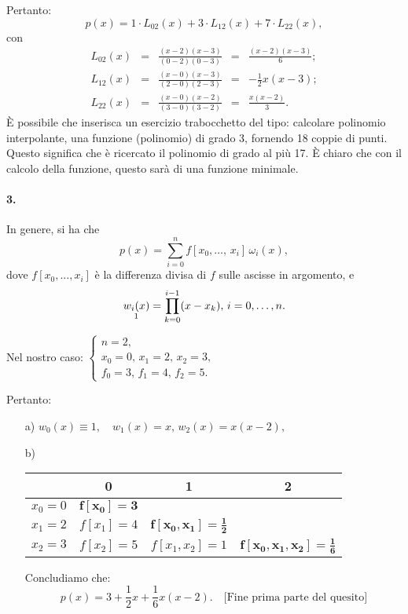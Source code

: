 \noindent Pertanto:
\begin{equation*}
    p(x) = 1\cdot L_{02}(x)+3\cdot L_{12}(x) + 7\cdot L_{22}(x),
\end{equation*}
con
\begin{equation*}
    \begin{matrix}
        L_{02}(x) &=& \frac{(x-2)(x-3)}{(0-2)(0-3)} &=& \frac{(x-2)(x-3)}{6};\\
        L_{12}(x) &=& \frac{(x-0)(x-3)}{(2-0)(2-3)} &=& -\frac{1}{2}x(x-3);\\
        L_{22}(x) &=& \frac{(x-0)(x-2)}{(3-0)(3-2)} &=& \frac{x(x-2)}{3}.
    \end{matrix}
\end{equation*}
È possibile che inserisca un esercizio trabocchetto del tipo: calcolare polinomio interpolante, una funzione (polinomio) di grado 3, fornendo 18 coppie di punti. Questo significa che è ricercato il polinomio di grado al più 17. È chiaro che con il calcolo della funzione, questo sarà di una funzione minimale.

\paragraph{3.} In genere, si ha che
\begin{equation*}
    p(x) = \sum_{i=0}^n f[x_0,\hdots,\, x_i]\,\omega_i(x),
\end{equation*}
dove $f[x_0,\hdots, x_i]$ è la differenza divisa di $f$ sulle ascisse in argomento, e
\begin{equation*}
    \underset{\footnotemark}{w_i(x)}=\prod_{k=0}^{i-1}(x-x_k),\, i=0,\hdots, n.
\end{equation*}

\noindent Nel nostro caso:
$\begin{cases}
    n=2,\\
    x_0=0,\, x_1=2,\, x_2 = 3,\\
    f_0 = 3,\, f_1=4,\, f_2=5.
\end{cases}$

\noindent Pertanto:
\begin{itemize}
    \item[a)] $w_0(x)\equiv 1,\quad w_1(x)=x,\, w_2(x)=x(x-2),$
    \item[b)]
    \begin{tabular}{c|ccc}
         & 0 & 1 & 2 \\
         \hline
        $x_0=0$ & $\boldsymbol{f[x_0]=3}$\\
        $x_1=2$ & $f[x_1]=4$ & $\boldsymbol{f[x_0, x_1]=\frac{1}{2}}$\\
        $x_2=3$ & $f[x_2]=5$ & $f[x_1, x_2]=1$ & $\boldsymbol{f[x_0, x_1, x_2]=\frac{1}{6}}$
    \end{tabular}
    
    \noindent Concludiamo che:
    \begin{equation*}
        p(x)=3+\frac{1}{2}x+\frac{1}{6}x(x-2).\quad \text{[Fine prima parte del quesito]}
    \end{equation*}
\end{itemize}

